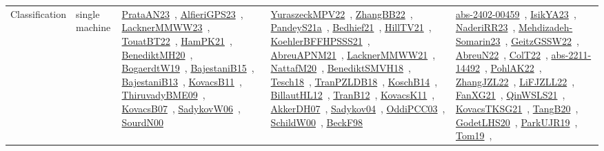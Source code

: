 {\begin{longtable}{lp{3cm}>{\raggedright\arraybackslash}p{6cm}>{\raggedright\arraybackslash}p{6cm}>{\raggedright\arraybackslash}p{8cm}}
Classification & single machine & \href{works/PrataAN23.pdf}{PrataAN23}~\cite{PrataAN23}, \href{works/AlfieriGPS23.pdf}{AlfieriGPS23}~\cite{AlfieriGPS23}, \href{works/LacknerMMWW23.pdf}{LacknerMMWW23}~\cite{LacknerMMWW23}, \href{works/TouatBT22.pdf}{TouatBT22}~\cite{TouatBT22}, \href{works/HamPK21.pdf}{HamPK21}~\cite{HamPK21}, \href{works/BenediktMH20.pdf}{BenediktMH20}~\cite{BenediktMH20}, \href{works/BogaerdtW19.pdf}{BogaerdtW19}~\cite{BogaerdtW19}, \href{works/BajestaniB15.pdf}{BajestaniB15}~\cite{BajestaniB15}, \href{works/BajestaniB13.pdf}{BajestaniB13}~\cite{BajestaniB13}, \href{works/KovacsB11.pdf}{KovacsB11}~\cite{KovacsB11}, \href{works/ThiruvadyBME09.pdf}{ThiruvadyBME09}~\cite{ThiruvadyBME09}, \href{works/KovacsB07.pdf}{KovacsB07}~\cite{KovacsB07}, \href{works/SadykovW06.pdf}{SadykovW06}~\cite{SadykovW06}, \href{works/SourdN00.pdf}{SourdN00}~\cite{SourdN00} & \href{works/YuraszeckMPV22.pdf}{YuraszeckMPV22}~\cite{YuraszeckMPV22}, \href{works/ZhangBB22.pdf}{ZhangBB22}~\cite{ZhangBB22}, \href{works/PandeyS21a.pdf}{PandeyS21a}~\cite{PandeyS21a}, \href{works/Bedhief21.pdf}{Bedhief21}~\cite{Bedhief21}, \href{works/HillTV21.pdf}{HillTV21}~\cite{HillTV21}, \href{works/KoehlerBFFHPSSS21.pdf}{KoehlerBFFHPSSS21}~\cite{KoehlerBFFHPSSS21}, \href{works/AbreuAPNM21.pdf}{AbreuAPNM21}~\cite{AbreuAPNM21}, \href{works/LacknerMMWW21.pdf}{LacknerMMWW21}~\cite{LacknerMMWW21}, \href{works/NattafM20.pdf}{NattafM20}~\cite{NattafM20}, \href{works/BenediktSMVH18.pdf}{BenediktSMVH18}~\cite{BenediktSMVH18}, \href{works/Tesch18.pdf}{Tesch18}~\cite{Tesch18}, \href{works/TranPZLDB18.pdf}{TranPZLDB18}~\cite{TranPZLDB18}, \href{works/KoschB14.pdf}{KoschB14}~\cite{KoschB14}, \href{works/BillautHL12.pdf}{BillautHL12}~\cite{BillautHL12}, \href{works/TranB12.pdf}{TranB12}~\cite{TranB12}, \href{works/KovacsK11.pdf}{KovacsK11}~\cite{KovacsK11}, \href{works/AkkerDH07.pdf}{AkkerDH07}~\cite{AkkerDH07}, \href{works/Sadykov04.pdf}{Sadykov04}~\cite{Sadykov04}, \href{works/OddiPCC03.pdf}{OddiPCC03}~\cite{OddiPCC03}, \href{works/SchildW00.pdf}{SchildW00}~\cite{SchildW00}, \href{works/BeckF98.pdf}{BeckF98}~\cite{BeckF98} & \href{works/abs-2402-00459.pdf}{abs-2402-00459}~\cite{abs-2402-00459}, \href{works/IsikYA23.pdf}{IsikYA23}~\cite{IsikYA23}, \href{works/NaderiRR23.pdf}{NaderiRR23}~\cite{NaderiRR23}, \href{works/Mehdizadeh-Somarin23.pdf}{Mehdizadeh-Somarin23}~\cite{Mehdizadeh-Somarin23}, \href{works/GeitzGSSW22.pdf}{GeitzGSSW22}~\cite{GeitzGSSW22}, \href{works/AbreuN22.pdf}{AbreuN22}~\cite{AbreuN22}, \href{works/ColT22.pdf}{ColT22}~\cite{ColT22}, \href{works/abs-2211-14492.pdf}{abs-2211-14492}~\cite{abs-2211-14492}, \href{works/PohlAK22.pdf}{PohlAK22}~\cite{PohlAK22}, \href{works/ZhangJZL22.pdf}{ZhangJZL22}~\cite{ZhangJZL22}, \href{works/LiFJZLL22.pdf}{LiFJZLL22}~\cite{LiFJZLL22}, \href{works/FanXG21.pdf}{FanXG21}~\cite{FanXG21}, \href{works/QinWSLS21.pdf}{QinWSLS21}~\cite{QinWSLS21}, \href{works/KovacsTKSG21.pdf}{KovacsTKSG21}~\cite{KovacsTKSG21}, \href{works/TangB20.pdf}{TangB20}~\cite{TangB20}, \href{works/GodetLHS20.pdf}{GodetLHS20}~\cite{GodetLHS20}, \href{works/ParkUJR19.pdf}{ParkUJR19}~\cite{ParkUJR19}, \href{works/Tom19.pdf}{Tom19}~\cite{Tom19}, 
\end{longtable}}
